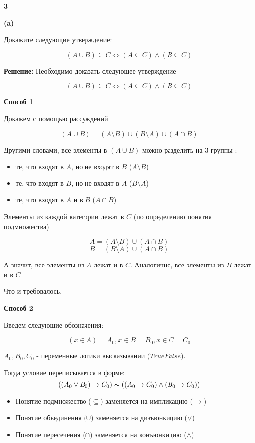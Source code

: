 \documentclass{article}
\begin{document}
\textbf {3}

\textbf {(a)}

Докажите следующие утверждение:

$$ (A \cup B) \subseteq C \iff (A \subseteq C) \wedge (B \subseteq C) $$

\textbf{Решение:}
Необходимо доказать следующее утверждение

$$ (A \cup B) \subseteq C \iff (A \subseteq C) \wedge (B \subseteq C) $$

\textbf{Способ 1} 

Докажем с помощью рассуждений

$$(A \cup B) = (A \setminus B) \cup (B \setminus A) \cup (A \cap B)$$

Другими словами, все элементы в $(A \cup B)$ можно разделить на 3 группы : 
\begin{itemize}
    \item те, что входят в $A$, но не входят в $B$ ($A \setminus B$)
    \item те, что входят в $B$, но не входят в $A$ ($B \setminus A$)
    \item те, что входят в $A$ и в $B$ ($A \cap B$)
\end{itemize}
 
Элементы из каждой категории лежат в $C$ (по определению понятия подмножества) 

$$A = (A \setminus B ) \cup (A \cap B)$$
$$B = (B \setminus A ) \cup (A \cap B)$$

А значит, все элементы из $A$ лежат и в $C$. Аналогично, все элементы из $B$ лежат и в $C$

Что и требовалось.

\textbf{Способ 2} 

Введем следующие обозначения: 

$$ (x \in A) = A_0, x \in B = B_0, x \in C = C_0$$

$A_0, B_0, C_0$ - переменные логики высказываний ($True False$). 

Тогда условие переписывается в форме:
$$((A_0 \vee B_0) \rightarrow C_0) \thicksim ((A_0 \rightarrow C_0) \wedge (B_0 \rightarrow C_0)) $$

\begin{itemize}
    \item Понятие подмножество ($\subseteq$) заменяется на импликацию ($\rightarrow$)
    \item Понятие обьединения ($\cup$) заменяется на дизъюнкицию ($\vee$)
    \item Понятие пересечения ($\cap$) заменяется на конъюнкицию ($\wedge$)
\end{itemize}
\end{document}
